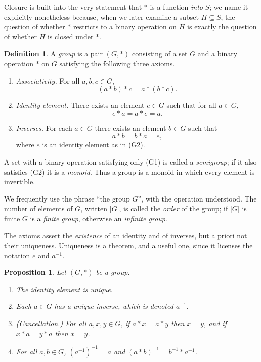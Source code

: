 \documentclass[11pt,a4paper]{article}
\newtheorem{proposition}[theorem]{Proposition}
\theoremstyle{definition}
\newtheorem{definition}[theorem]{Definition}
\theoremstyle{remark}
\begin{document}
Closure is built into the very statement that \(\ast\) is a function \emph{into} \(S\); we name it explicitly nonetheless because, when we later examine a subset \(H \subseteq S\), the question of whether \(\ast\) restricts to a binary operation on \(H\) is exactly the question of whether \(H\) is closed under \(\ast\).

\begin{definition}\label{groups:def-group}
A \emph{group} is a pair \((G, \ast)\) consisting of a set \(G\) and a binary operation \(\ast\) on \(G\) satisfying the following three axioms.
\begin{enumerate}
\item[(G1)] \emph{Associativity.} For all \(a,b,c \in G\),
\[
(a \ast b) \ast c = a \ast (b \ast c).
\]
\item[(G2)] \emph{Identity element.} There exists an element \(e \in G\) such that for all \(a \in G\),
\[
e \ast a = a \ast e = a.
\]
\item[(G3)] \emph{Inverses.} For each \(a \in G\) there exists an element \(b \in G\) such that
\[
a \ast b = b \ast a = e,
\]
where \(e\) is an identity element as in (G2).
\end{enumerate}
A set with a binary operation satisfying only (G1) is called a \emph{semigroup}; if it also satisfies (G2) it is a \emph{monoid}. Thus a group is a monoid in which every element is invertible.
\end{definition}

We frequently use the phrase ``the group \(G\)'', with the operation understood. The number of elements of \(G\), written \(|G|\), is called the \emph{order} of the group; if \(|G|\) is finite \(G\) is a \emph{finite group}, otherwise an \emph{infinite group}.

The axioms assert the \emph{existence} of an identity and of inverses, but a priori not their uniqueness. Uniqueness is a theorem, and a useful one, since it licenses the notation \(e\) and \(a^{-1}\).

\begin{proposition}\label{groups:prop-unique-id-inv}
Let \((G,\ast)\) be a group.
\begin{enumerate}
\item The identity element is unique.
\item Each \(a \in G\) has a unique inverse, which is denoted \(a^{-1}\).
\item \emph{(Cancellation.)} For all \(a,x,y \in G\), if \(a \ast x = a \ast y\) then \(x = y\), and if \(x \ast a = y \ast a\) then \(x = y\).
\item For all \(a,b \in G\), \((a^{-1})^{-1} = a\) and \((a \ast b)^{-1} = b^{-1} \ast a^{-1}\).
\end{enumerate}
\end{proposition}
\end{document}
